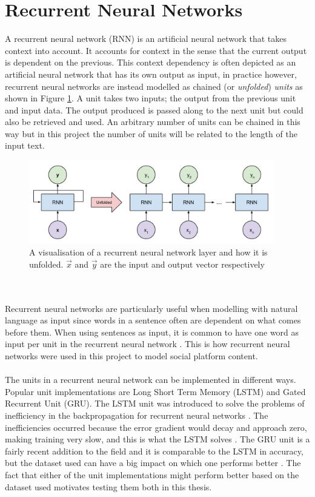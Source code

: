 \section{Recurrent Neural Networks }\label{sec:rnn}
A recurrent neural network (RNN) is an artificial neural network that takes context into account. It accounts for context in the sense that the current output is dependent on the previous. This context dependency is often depicted as an artificial neural network that has its own output as input, in practice however, recurrent neural networks are instead modelled as chained (or \textit{unfolded}) \textit{units} as shown in Figure \ref{fig:chained_units}. A unit takes two inputs; the output from the previous unit and input data. The output produced is passed along to the next unit but could also be retrieved and used. An arbitrary number of units can be chained in this way but in this project the number of units will be related to the length of the input text. 
\begin{figure}[h!]
    \centering
    \includegraphics[width=0.95\textwidth]{figure/ann/rnn_unfold}
    \caption{A visualisation of a recurrent neural network layer and how it is unfolded. $\vec{x}$ and $\vec{y}$ are the input and output vector respectively}
    \label{fig:chained_units}
\end{figure}
\\\\
Recurrent neural networks are particularly useful when modelling with natural language as input since words in a sentence often are dependent on what comes before them. When using sentences as input, it is common to have one word as input per unit in the recurrent neural network \parencite{palangi2016deep}. This is how recurrent neural networks were used in this project to model social platform content.
\\\\
The units in a recurrent neural network can be implemented in different ways. Popular unit implementations are Long Short Term Memory (LSTM) and Gated Recurrent Unit (GRU). The LSTM unit was introduced to solve the problems of inefficiency in the backpropagation for recurrent neural networks \parencite{LSTMdefined}. The inefficiencies occurred because the error gradient would decay and approach zero, making training very slow, and this is what the LSTM solves \parencite{hochreiter1998vanishing}. The GRU unit is a fairly recent addition to the field and it is comparable to the LSTM in accuracy, but the dataset used can have a big impact on which one performs better \parencite{GRUchung2014empirical}. The fact that either of the unit implementations might perform better based on the dataset used motivates testing them both in this thesis.

